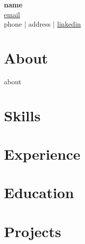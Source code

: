 \documentclass[10pt]{article}
\begin{document}
\begin{center}
    {\Huge \textbf{ {{ name }} }}\\
    \vspace{0.2cm}
    \href{mailto:{{ email }}}{{ email }} \\
    {{ phone }} | {{ address }} | \href{https://{{ linkedin }}}{{ linkedin }}
\end{center}

\section*{About}
{{ about }}

{%
\section*{Skills}
{%

{%
\section*{Experience}
{%

{%
\section*{Education}
{%

{%
\section*{Projects}
{%

{%
}}}}}}}}}
\end{document}

